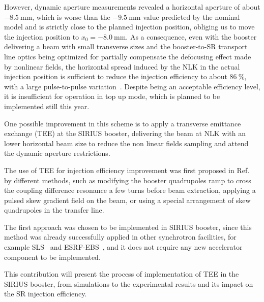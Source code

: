 \documentclass[a4paper,
               keeplastbox,   %
              nospread,     %
               ]{jacow}
\begin{document}

However, dynamic aperture measurements revealed a horizontal aperture of about $\SI{-8.5}{\milli \meter}$, which is worse than the $\SI{-9.5}{\milli \meter}$ value predicted by the nominal model \cite{Dester:IPAC17-WEPIK052} and is strictly close to the planned injection position,
obliging us to move the injection position to $x_0=\SI{-8.0}{\milli \meter}$. As a consequence, even with the booster delivering a beam with small transverse sizes and the booster-to-SR transport line optics being optimized for partially compensate the defocusing effect made by nonlinear fields, the horizontal spread induced by the NLK in the actual injection position is sufficient to reduce the injection efficiency to about $\SI{86}{\%}$, with a large pulse-to-pulse variation~\cite{Resende:IPAC22-THPOPT038}. Despite being an acceptable efficiency level, it is insufficient for operation in top up mode, which is planned to be implemented still this year.

One possible improvement in this scheme is to apply a transverse emittance exchange (TEE) at the SIRIUS booster, delivering the beam at NLK with an lower horizontal beam size to reduce the non linear fields sampling and attend the dynamic aperture restrictions.

The use of TEE for injection efficiency improvement was first proposed in Ref.~\cite{Kuske:IPAC16-WEOAA01} by different methods, such as modifying the booster quadrupoles ramp to cross the coupling difference resonance a few turns before beam extraction, applying a pulsed skew gradient field on the beam, or using a special arrangement of skew quadrupoles in the transfer line.

The first approach was chosen to be implemented in SIRIUS booster, since this method was already successfully applied in other synchrotron facilities, for example SLS~\cite{Kallestrup:IPAC21-MOPAB020} and ESRF-EBS~\cite{Carmignani:IPAC21-MOPAB051}, and it does not require any new accelerator component to be implemented.

This contribution will present the process of implementation of TEE in the SIRIUS booster, from simulations to the experimental results and its impact on the SR injection efficiency.
\end{document}
